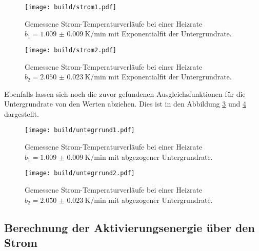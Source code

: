\begin{figure}
    \centering
    \texttt{[image: build/strom1.pdf]}
    \caption{Gemessene Strom-Temperaturverläufe bei einer Heizrate \newline $ b_1 = \SI{1.009(9)}{\kelvin\per\minute}$ mit Exponentialfit der Untergrundrate.
            }
    \label{fig:a2}
\end{figure}
\begin{figure}
    \centering
    \texttt{[image: build/strom2.pdf]}
    \caption{Gemessene Strom-Temperaturverläufe bei einer Heizrate \newline $b_2 = \SI{2.050(23)}{\kelvin\per\minute}$ mit Exponentialfit der Untergrundrate.
            }
    \label{fig:a3}
\end{figure}
Ebenfalls lassen sich noch die zuvor gefundenen Ausgleichsfunktionen für die Untergrundrate von den Werten abziehen. Dies ist in den Abbildung \ref{fig:b1} und \ref{fig:b2}
dargestellt.
\begin{figure}
    \centering
    \texttt{[image: build/untegrrund1.pdf]}
    \caption{Gemessene Strom-Temperaturverläufe bei einer Heizrate \newline $ b_1 = \SI{1.009(9)}{\kelvin\per\minute}$ mit abgezogener Untergrundrate.
            }
    \label{fig:b1}
\end{figure}
\begin{figure}
    \centering
    \texttt{[image: build/untegrrund2.pdf]}
    \caption{Gemessene Strom-Temperaturverläufe bei einer Heizrate \newline $b_2 = \SI{2.050(23)}{\kelvin\per\minute}$ mit abgezogener Untergrundrate.
            }
    \label{fig:b2}
\end{figure}
\subsection{Berechnung der Aktivierungsenergie über den Strom} 

